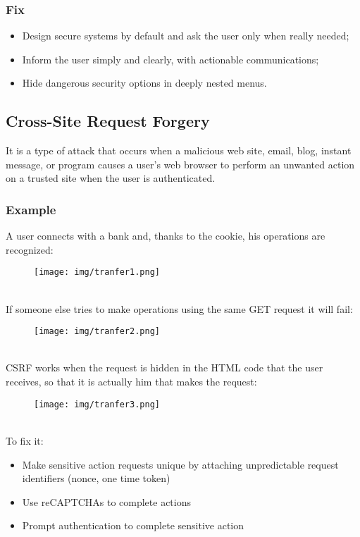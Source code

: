 \documentclass[a4paper, 10pt, titlepage]{article}
\begin{document}
\subsubsection*{Fix}
\begin{itemize}
\item Design secure systems by default and ask the user only when really needed;
\item Inform the user simply and clearly, with actionable communications;
\item Hide dangerous security options in deeply nested menus.
\end{itemize}


\newpage
\subsection{Cross-Site Request Forgery}
It is a type of attack that occurs when a malicious web site, email, blog, instant message, or program causes a user's web browser to perform an unwanted action on a trusted site when the user is authenticated.

\subsubsection*{Example}
A user connects with a bank and, thanks to the cookie, his operations are recognized:
\begin{figure}[h]
\centering
\texttt{[image: img/tranfer1.png]}
\end{figure}\\
If someone else tries to make operations using the same GET request it will fail:
\begin{figure}[h]
\centering
\texttt{[image: img/tranfer2.png]}
\end{figure}\\
CSRF works when the request is hidden in the HTML code that the user receives, so that it is actually him that makes the request:
\begin{figure}[h]
\centering
\texttt{[image: img/tranfer3.png]}
\end{figure} \\
To fix it:
\begin{itemize}
\item Make sensitive action requests unique by attaching unpredictable request identifiers (nonce, one time token)
\item Use reCAPTCHAs to complete actions
\item Prompt authentication to complete sensitive action
\end{itemize}
\end{document}
